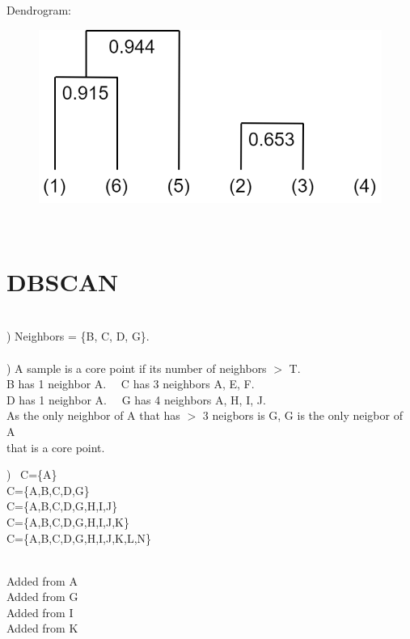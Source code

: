 \documentclass[12pt]{article}
\begin{document}
\begin{center}Dendrogram:\end{center}
\begin{figure}[h!]
  \centering
  \includegraphics[scale=.5]{Pics/Q6.png}
\end{figure}




\noindent \hrulefill \\\pagebreak



\section{DBSCAN}\ \\


) Neighbors = \{B, C, D, G\}.\\\\


) A sample is a core point if its number of neighbors $>$ T.\\[.4em]
\indent B has 1 neighbor A. \ \ C has 3 neighbors A, E, F. \\
\indent D has 1 neighbor A. \ \ G has 4 neighbors A, H, I, J.\\[.4em]
\indent As the only neighbor of A that has $>$ 3 neigbors is G, G is the only neigbor of A \\
\indent that is a core point.\\


\begin{multicols}{2}

) \ C=\{A\}\\
\indent C=\{A,B,C,D,G\}\\
\indent C=\{A,B,C,D,G,H,I,J\}\\
\indent C=\{A,B,C,D,G,H,I,J,K\}\\
\indent C=\{A,B,C,D,G,H,I,J,K,L,N\}\\

\columnbreak

\ \\
Added from A\\
Added from G\\
Added from I\\
Added from K\\

\end{multicols}
\end{document}
